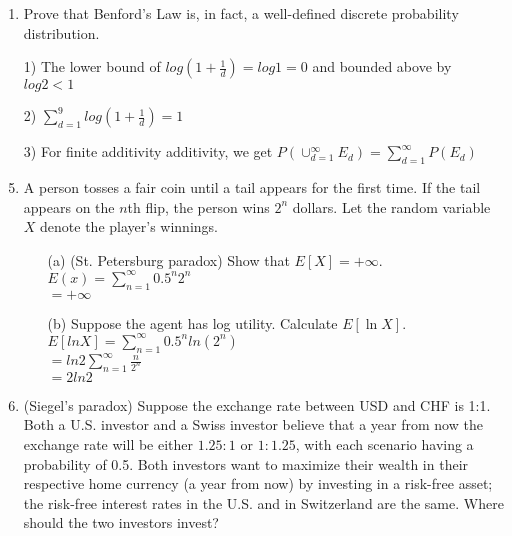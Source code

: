\documentclass[letterpaper,12pt]{article}
\theoremstyle{definition}
\begin{document}
\begin{enumerate}
\begin{itemize}
		\end{itemize}
   	\item Prove that Benford's Law is, in fact, a well-defined discrete probability distribution.\\
		\item[1)] 
		The lower bound of $log(1 + \frac{1}{d}) = log1 = 0$ and bounded above by $log2 < 1$\\

		\item[2)]
		$\sum_{d = 1}^{9} log(1 + \frac{1}{d}) = 1$\\

		\item[3)]
		For finite additivity additivity, we get $P(\cup_{d = 1}^{\infty} E_d) = \sum_{d = 1}^{\infty} P(E_d)$\\

   	\item A person tosses a fair coin until a tail appears for the first time. If the tail appears on the $n$th flip, the person wins $2^n$ dollars. Let the random variable $X$ denote the player's winnings.
		\begin{itemize}
			\item[(a)] (St. Petersburg paradox) Show that $E[X]= + \infty$.\\
			
			$E(x) = \sum_{n = 1}^{\infty} 0.5^n2^n$\\
			$= +\infty$

			\item[(b)] Suppose the agent has log utility. Calculate $E[\ln X]$.\\
			
			$E[ln X] = \sum_{n = 1}^{\infty} 0.5^nln(2^n)$\\
			$= ln2\sum_{n = 1}^{\infty} \frac{n}{2^n}$\\
			$= 2ln2$
		\end{itemize}
	
	\item (Siegel's paradox) Suppose the exchange rate between USD and CHF is 1:1. Both a U.S. investor and a Swiss investor believe that a year from now the exchange rate will be either $1.25:1$ or $1:1.25$, with each scenario having a probability of 0.5. Both investors want to maximize their wealth in their respective home currency (a year from now) by investing in a risk-free asset; the risk-free interest rates in the U.S. and in Switzerland are the same. Where should the two investors invest?\\
		

\end{enumerate}
\end{document}
